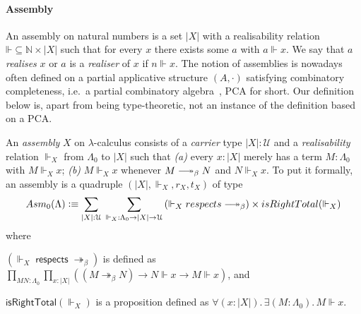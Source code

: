 \documentclass[a4paper,UKenglish,numberwithinsect,cleveref,thm-restate]{lipics-v2021}
\newcommand{\Asm}{\mathsf{Asm}}
\newcommand{\defeq}{\vcentcolon\equiv}
\newcommand{\Univ}{\mathcal{U}}
\DeclareRobustCommand\longtwoheadrightarrow{\relbar\joinrel\twoheadrightarrow}
\newcommand{\reduce}{\longtwoheadrightarrow_{\beta}}
\theoremstyle{plain}
\begin{document}
\paragraph*{Assembly}
An assembly on natural numbers is a set $|X|$ with a realisability relation $\mathord{\Vdash} \subseteq \mathbb{N} \times |X|$ such that for every $x$ there exists some $a$ with $a \Vdash x$. We say that $a$ \emph{realises} $x$ or $a$ is a \emph{realiser} of $x$ if $n \Vdash x$.
The notion of assemblies is nowadays often defined on a partial applicative structure $(A, \cdot)$ satisfying combinatory completeness, i.e.\ a partial combinatory algebra~\cite{Oosten2008}, PCA for short.
Our definition below is, apart from being type-theoretic, not an instance of the definition based on a PCA.
\begin{definition}\label{def:assembly}
  An \emph{assembly} $X$ on $\lambda$-calculus consists of a \emph{carrier} type $|X| : \Univ$ and a \emph{realisability} relation ${\Vdash_X}$ from $\Lambda_0$ to $|X|$ such that
  \emph{(a)} every $x : |X|$ merely has a term $M : \Lambda_0$ with $M \Vdash_X x$;
  \emph{(b)} $M \Vdash_X x$ whenever $M \reduce N$ and $N \Vdash_X x$.
  To put it formally, an assembly is a quadruple $(|X|, \Vdash_X, r_X, t_X)$ of type
  \[
    \Asm_0(\Lambda) \defeq \sum_{|X| : \Univ}\;\sum_{\mathord{\Vdash_X}:\Lambda_0 \to |X| \to \Univ} 
    \left(\mathord{\Vdash_X}\;\mathsf{respects}\;\mathord{\reduce}\right)
      \times \mathsf{isRightTotal}({\Vdash_X})
  \]
  where
  \begin{romanenumerate}
    \item $\left(\mathord{\Vdash_X}\;\mathsf{respects}\;\mathord{\twoheadrightarrow_\beta}\right)$ is defined as $\prod_{M N : \Lambda_0} \prod_{x : |X|} \left( \left(M \twoheadrightarrow_ \beta N\right) \to N \Vdash x \to M \Vdash x \right) $, and

    \item $\mathsf{isRightTotal}(\Vdash_X)$ is a proposition defined as $\forall (x : |X|).\, \exists (M : \Lambda_0).\, M \Vdash x$.
  \end{romanenumerate}
\end{definition}
\end{document}
